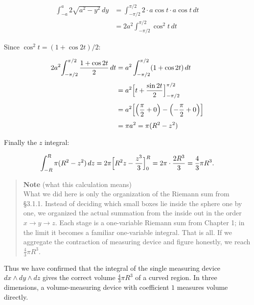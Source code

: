 \documentclass[a4paper,12pt,openany]{book}
\begin{document}
\[\begin{aligned}
\int_{-a}^{a} 2\sqrt{a^2 - y^2}\,dy
&= \int_{-\pi/2}^{\pi/2} 2\cdot a\cos t \cdot a\cos t\,dt \\
&= 2a^2\!\int_{-\pi/2}^{\pi/2} \cos^2 t\,dt
\end{aligned}\]

Since \(\cos^2 t = (1 + \cos 2t)/2\):

\[\begin{aligned}
2a^2\!\int_{-\pi/2}^{\pi/2} \frac{1 + \cos 2t}{2}\,dt
&= a^2\int_{-\pi/2}^{\pi/2} (1 + \cos 2t)\,dt \\[4pt]
&= a^2\Bigl[t + \frac{\sin 2t}{2}\Bigr]_{-\pi/2}^{\pi/2} \\[4pt]
&= a^2\Bigl[\Bigl(\frac{\pi}{2} + 0\Bigr) - \Bigl(-\frac{\pi}{2} + 0\Bigr)\Bigr] \\[4pt]
&= \pi a^2 = \pi(R^2 - z^2)
\end{aligned}\]

Finally the \(z\) integral:

\[\int_{-R}^{R} \pi(R^2 - z^2)\,dz = 2\pi\Bigl[R^2 z - \frac{z^3}{3}\Bigr]_{0}^{R} = 2\pi\cdot\frac{2R^3}{3} = \frac{4}{3}\pi R^3.\]

\begin{quote}
\textbf{Note} (what this calculation means)\\
What we did here is only the organization of the Riemann sum from
§3.1.1. Instead of deciding which small boxes lie inside the sphere one
by one, we organized the actual summation from the inside out in the
order \(x \to y \to z\). Each stage is a one-variable Riemann sum from
Chapter 1; in the limit it becomes a familiar one-variable integral.
That is all. If we aggregate the contraction of measuring device and
figure honestly, we reach \(\frac{4}{3}\pi R^3\).
\end{quote}

Thus we have confirmed that the integral of the single measuring device
\(dx \wedge dy \wedge dz\) gives the correct volume
\(\frac{4}{3}\pi R^3\) of a curved region. In three dimensions, a
volume-measuring device with coefficient \(1\) measures volume directly.

\par\vspace{0.35em}\par
\end{document}

